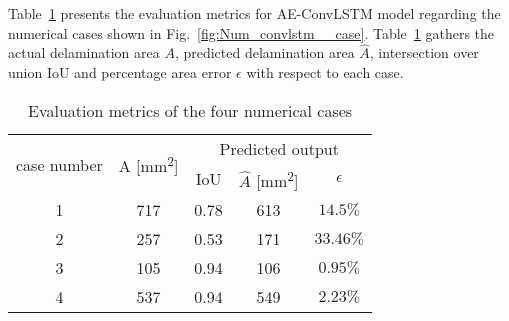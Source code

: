 Table~\ref{tab:num_cases} presents the evaluation metrics for AE-ConvLSTM model regarding the numerical cases shown in Fig.~\ref{fig:Num_convlstm__case}.
Table~\ref{tab:num_cases} gathers the actual delamination area \(A\), predicted delamination area \(\hat{A}\), intersection over union IoU and percentage area error \(\epsilon\) with respect to each case. 
\begin{table}[!h]
	\centering
	\caption{Evaluation metrics of the four numerical cases}
	\begin{tabular}{ccccc}
		\toprule
		\multirow{2}{*}{case number} & \multicolumn{1}{c}{\multirow{2}{*}{A [mm\textsuperscript{2}]}} & \multicolumn{3}{c}{Predicted output} \\ 
		\cmidrule(lr){3-5} & & \multicolumn{1}{c}{IoU} & \multicolumn{1}{c}{\(\hat{A}\) [mm\textsuperscript{2}]} & \(\epsilon\) \\
		\midrule
		1 & 717 & \multicolumn{1}{c}{0.78} & \multicolumn{1}{c}{613} & \(14.5\%\) \\ 
		2 & 257 & \multicolumn{1}{c}{0.53} & \multicolumn{1}{c}{171} & \(33.46\%\) \\ 
		3 & 105 & \multicolumn{1}{c}{0.94} & \multicolumn{1}{c}{106} & \(0.95\%\) \\ 
		4 & 537 & \multicolumn{1}{c}{0.94} & \multicolumn{1}{c}{549} & \(2.23\%\) \\ 
		\bottomrule
	\end{tabular}	
	\label{tab:num_cases}
\end{table}

